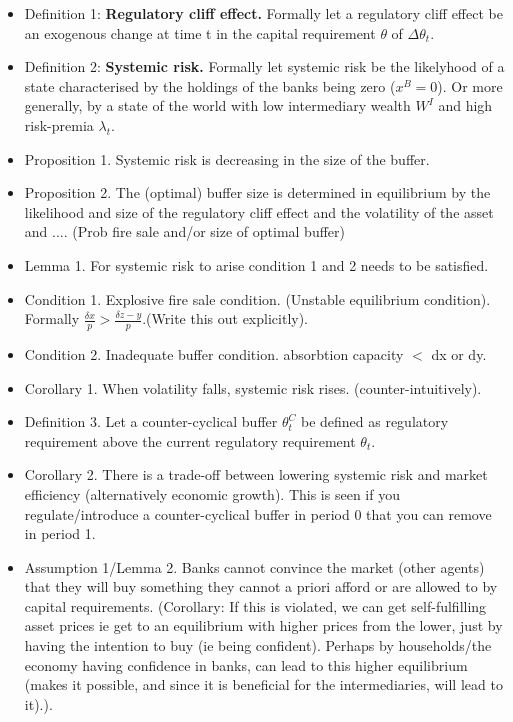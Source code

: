 \documentclass[11pt]{article}
\begin{document}
\begin{itemize}
\item Definition 1: \textbf{Regulatory cliff effect.} Formally let a regulatory cliff effect be an exogenous change at time t in the capital requirement $\theta$ of $\Delta \theta_t$. 

\item Definition 2: \textbf{Systemic risk.} Formally let systemic risk be the likelyhood of a state characterised by the holdings of the banks being zero ($x^B = 0$). Or more generally, by a state of the world with low intermediary wealth $W^I$ and high risk-premia $\lambda_t$.

\item Proposition 1. Systemic risk is decreasing in the size of the buffer.

\item Proposition 2. The (optimal) buffer size is determined in equilibrium by the likelihood and size of the regulatory cliff effect and the volatility of the asset and .... 
(Prob fire sale and/or size of optimal buffer)

\item Lemma 1. For systemic risk to arise condition 1 and 2 needs to be satisfied.

\item Condition 1. Explosive fire sale condition. (Unstable equilibrium condition). Formally $\frac{\delta x}{p} > \frac{\delta z-y}{p}$.(Write this out explicitly).

\item Condition 2. Inadequate buffer condition. absorbtion capacity $<$ dx or dy.

\item Corollary 1. When volatility falls, systemic risk rises. (counter-intuitively).

\item Definition 3. Let a counter-cyclical buffer $\theta^C_t$ be defined as regulatory requirement above the current regulatory requirement $\theta_t$.

\item Corollary 2. There is a trade-off between lowering systemic risk and market efficiency (alternatively economic growth). This is seen if you regulate/introduce a counter-cyclical buffer in period 0 that you can remove in period 1.

\item Assumption 1/Lemma 2. Banks cannot convince the market (other agents) that they will buy something they cannot a priori afford or are allowed to by capital requirements. (Corollary: If this is violated, we can get self-fulfilling asset prices ie get to an equilibrium with higher prices from the lower, just by having the intention to buy (ie being confident). Perhaps by households/the economy having confidence in banks, can lead to this higher equilibrium (makes it possible, and since it is beneficial for the intermediaries, will lead to it).). 


\end{itemize}
\end{document}
